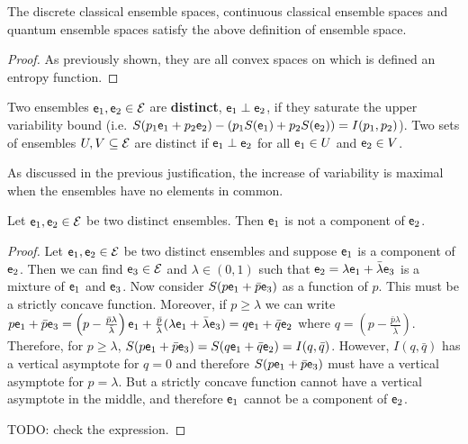 \begin{prop}
	The discrete classical ensemble spaces, continuous classical ensemble spaces and quantum ensemble spaces satisfy the above definition of ensemble space.
\end{prop}

\begin{proof}
	As previously shown, they are all convex spaces on which is defined an entropy function.
\end{proof}

\begin{defn}
	Two ensembles $\mathsf{e}_1, \mathsf{e}_2 \in \mathcal{E}$ are \textbf{distinct}, $\mathsf{e}_1 \perp \mathsf{e}_2$, if they saturate the upper variability bound (i.e. $S(p_1\mathsf{e}_1 + p_2 \mathsf{e}_2) - (p_1 S(\mathsf{e}_1) + p_2 S(\mathsf{e}_2)) = I(p_1, p_2)$). Two sets of ensembles $U, V \subseteq \mathcal{E}$ are distinct if $\mathsf{e}_1 \perp \mathsf{e}_2$ for all $\mathsf{e}_1 \in U$ and $\mathsf{e}_2 \in V$. 
\end{defn}

\begin{justification}
	As discussed in the previous justification, the increase of variability is maximal when the ensembles have no elements in common.
\end{justification}

\begin{prop}
	Let $\mathsf{e}_1, \mathsf{e}_2 \in \mathcal{E}$ be two distinct ensembles. Then $\mathsf{e}_1$ is not a component of $\mathsf{e}_2$.
\end{prop}

\begin{proof}
	Let $\mathsf{e}_1, \mathsf{e}_2 \in \mathcal{E}$ be two distinct ensembles and suppose $\mathsf{e}_1$ is a component of $\mathsf{e}_2$. Then we can find $\mathsf{e}_3 \in \mathcal{E}$ and $\lambda \in (0,1)$ such that $\mathsf{e}_2 = \lambda \mathsf{e}_1 + \bar{\lambda} \mathsf{e}_3$ is a mixture of $\mathsf{e}_1$ and $\mathsf{e}_3$. Now consider $S(p \mathsf{e}_1 + \bar{p} \mathsf{e}_3)$ as a function of $p$. This must be a strictly concave function. Moreover, if $p \geq \lambda$ we can write $p \mathsf{e}_1 + \bar{p} \mathsf{e}_3 = \left(p - \frac{\bar{p} \lambda}{\bar{\lambda}}\right) \mathsf{e}_1 + \frac{\bar{p}}{\bar{\lambda}} (\lambda \mathsf{e}_1 + \bar{\lambda} \mathsf{e}_3) = q \mathsf{e}_1 + \bar{q} \mathsf{e}_2$ where $q = \left(p - \frac{\bar{p} \lambda}{\bar{\lambda}}\right)$. Therefore, for $p \geq \lambda$, $S(p \mathsf{e}_1 + \bar{p} \mathsf{e}_3) = S(q \mathsf{e}_1 + \bar{q} \mathsf{e}_2)  = I(q,\bar{q})$. However, $I(q,\bar{q})$ has a vertical asymptote for $q=0$ and therefore $S(p \mathsf{e}_1 + \bar{p} \mathsf{e}_3)$ must have a vertical asymptote for $p=\lambda$. But a strictly concave function cannot have a vertical asymptote in the middle, and therefore $\mathsf{e}_1$ cannot be a component of $\mathsf{e}_2$.
	
	TODO: check the expression.
\end{proof}

